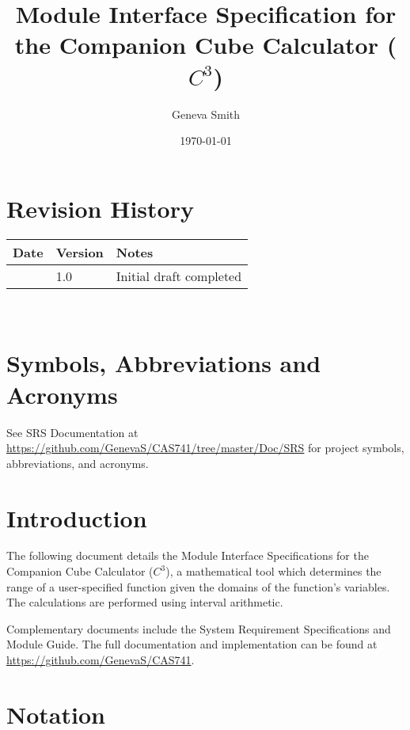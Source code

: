\documentclass[12pt, titlepage]{article}
\newcommand{\progname}{Companion Cube Calculator}
\newcommand{\prognameAbbrv}{$C^{3}$}
\begin{document}
\title{Module Interface Specification for the \progname{} (\prognameAbbrv{})}

\author{Geneva Smith}

\date{\today}

\maketitle


\section{Revision History}

\begin{tabularx}{\textwidth}{p{3cm}p{2cm}X}
\toprule {\bf Date} & {\bf Version} & {\bf Notes}\\
\midrule
 & 1.0 & Initial draft completed\\
\bottomrule
\end{tabularx}

~\newpage

\section{Symbols, Abbreviations and Acronyms}

See SRS Documentation at 
\url{https://github.com/GenevaS/CAS741/tree/master/Doc/SRS} for project 
symbols, abbreviations, and acronyms.

\newpage

\tableofcontents

\newpage


\section{Introduction}

The following document details the Module Interface Specifications for the 
\progname{} (\prognameAbbrv{}), a mathematical tool which determines the range 
of a user-specified function given the domains of the function's variables. The 
calculations are performed using interval arithmetic.

Complementary documents include the System Requirement Specifications
and Module Guide.  The full documentation and implementation can be
found at \url{https://github.com/GenevaS/CAS741}.

\section{Notation}
\end{document}
